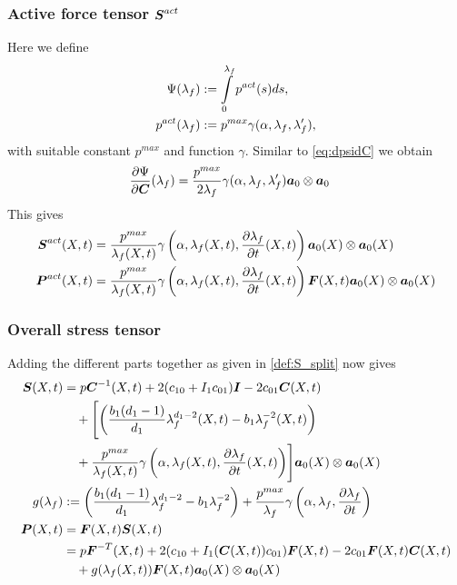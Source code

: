 \subsubsection{Active force tensor $\boldsymbol{S}^{act}$}
Here we define
\begin{align*}
	\Psi(\lambda_f) &:= \int\limits_{0}^{\lambda_f} p^{act}(s)ds,\\
	p^{act}(\lambda_f) &:= p^{max}\gamma(\alpha,\lambda_f,\lambda_f'),
\end{align*}
with suitable constant $p^{max}$ and function $\gamma$.
Similar to \eqref{eq:dpsidC} we obtain
\begin{align}
	\frac{\partial \Psi}{\partial \boldsymbol{C}}(\lambda_f) &= \frac{p^{max}}{2\lambda_f}\gamma(\alpha,\lambda_f,\lambda_f')\boldsymbol{a}_0\otimes\boldsymbol{a}_0
\end{align}
This gives
\begin{align}
	\boldsymbol{S}^{act}(X,t) &= \frac{p^{max}}{\lambda_f(X,t)}\gamma\left(\alpha,\lambda_f(X,t),\frac{\partial \lambda_f}{\partial t}(X,t)\right)\boldsymbol{a}_0(X)\otimes\boldsymbol{a}_0(X)\\
	\boldsymbol{P}^{act}(X,t) &= \frac{p^{max}}{\lambda_f(X,t)}\gamma\left(\alpha,\lambda_f(X,t),\frac{\partial \lambda_f}{\partial t}(X,t)\right)\boldsymbol{F}(X,t)\boldsymbol{a}_0(X)\otimes\boldsymbol{a}_0(X)
\end{align}

\subsubsection{Overall stress tensor}
Adding the different parts together as given in \eqref{def:S_split} now gives
\begin{align}
	\boldsymbol{S}(X,t) &= p\boldsymbol{C}^{-1}(X,t) + 2(c_{10} + I_1c_{01})\boldsymbol{I} - 2c_{01}\boldsymbol{C}(X,t)\\
			 &\quad+\Biggl[\left(\frac{b_1(d_1-1)}{d_1}\lambda_f^{d_1-2}(X,t) - b_1\lambda_f^{-2}(X,t)\right)\nonumber\\
			 &\quad+\frac{p^{max}}{\lambda_f(X,t)}\gamma\left(\alpha,\lambda_f(X,t),\frac{\partial \lambda_f}{\partial t}(X,t)\right)\Biggr]\boldsymbol{a}_0(X)\otimes\boldsymbol{a}_0(X)\nonumber\\
	g(\lambda_f)&:= \left(\frac{b_1(d_1-1)}{d_1}\lambda_f^{d_1-2} - b_1\lambda_f^{-2}\right)
		+\frac{p^{max}}{\lambda_f}\gamma\left(\alpha,\lambda_f,\frac{\partial \lambda_f}{\partial t}\right)\label{def:g}\\			 
	\boldsymbol{P}(X,t) &= \boldsymbol{F}(X,t)\boldsymbol{S}(X,t)\label{def:completeP}\\
			 &= p\boldsymbol{F}^{-T}(X,t) + 2(c_{10} + I_1(\boldsymbol{C}(X,t))c_{01})\boldsymbol{F}(X,t) - 2c_{01}\boldsymbol{F}(X,t)\boldsymbol{C}(X,t)\nonumber\\
			 &\quad+g(\lambda_f(X,t))\boldsymbol{F}(X,t)\boldsymbol{a}_0(X)\otimes\boldsymbol{a}_0(X)\nonumber
\end{align}

